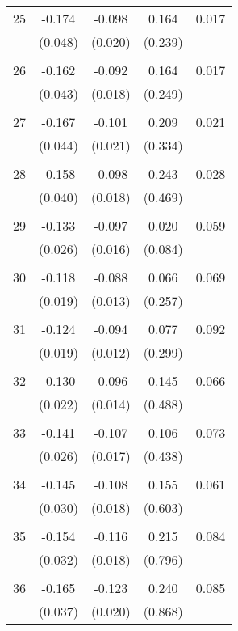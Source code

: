 \begin{tabular}{l*{1}{cccc}}
  25       & -0.174 & -0.098 & 0.164 & 0.017 \\
          & (0.048) & (0.020) & (0.239) & \\
 & & & &\\
  26       & -0.162 & -0.092 & 0.164 & 0.017 \\
          & (0.043) & (0.018) & (0.249) & \\
 & & & &\\
  27       & -0.167 & -0.101 & 0.209 & 0.021 \\
          & (0.044) & (0.021) & (0.334) & \\
 & & & &\\
  28       & -0.158 & -0.098 & 0.243 & 0.028 \\
          & (0.040) & (0.018) & (0.469) & \\
 & & & &\\
  29       & -0.133 & -0.097 & 0.020 & 0.059 \\
          & (0.026) & (0.016) & (0.084) & \\
 & & & &\\
  30       & -0.118 & -0.088 & 0.066 & 0.069 \\
          & (0.019) & (0.013) & (0.257) & \\
 & & & &\\
  31       & -0.124 & -0.094 & 0.077 & 0.092 \\
          & (0.019) & (0.012) & (0.299) & \\
 & & & &\\
  32       & -0.130 & -0.096 & 0.145 & 0.066 \\
          & (0.022) & (0.014) & (0.488) & \\
 & & & &\\
  33       & -0.141 & -0.107 & 0.106 & 0.073 \\
          & (0.026) & (0.017) & (0.438) & \\
 & & & &\\
  34       & -0.145 & -0.108 & 0.155 & 0.061 \\
          & (0.030) & (0.018) & (0.603) & \\
 & & & &\\
  35       & -0.154 & -0.116 & 0.215 & 0.084 \\
          & (0.032) & (0.018) & (0.796) & \\
 & & & &\\
  36       & -0.165 & -0.123 & 0.240 & 0.085 \\
          & (0.037) & (0.020) & (0.868) & \\

\end{tabular}
